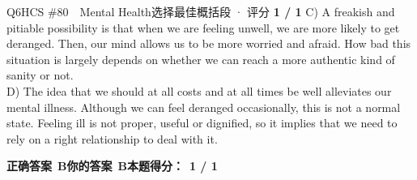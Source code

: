 \begin{qblock}{Q6\quad HCS \#80\ \ Mental Health}{选择最佳概括段 · 评分 \textcolor{cAccent}{\bfseries 1 / 1}}
{C) A freakish and pitiable possibility is that when we are feeling unwell, we are more likely to get deranged. Then, our mind allows us to be more worried and afraid. How bad this situation is largely depends on whether we can reach a more authentic kind of sanity or not.\\
D) The idea that we should at all costs and at all times be well alleviates our mental illness. Although we can feel deranged occasionally, this is not a normal state. Feeling ill is not proper, useful or dignified, so it implies that we need to rely on a right relationship to deal with it.}
\par\smallskip
\textbf{正确答案}\ \textcolor{cFix}{\bfseries B}\qquad\textbf{你的答案}\ \textcolor{cFix}{\bfseries B}\qquad\textbf{本题得分：}\ {\color{cAccent}\bfseries 1 / 1}
\end{qblock}

